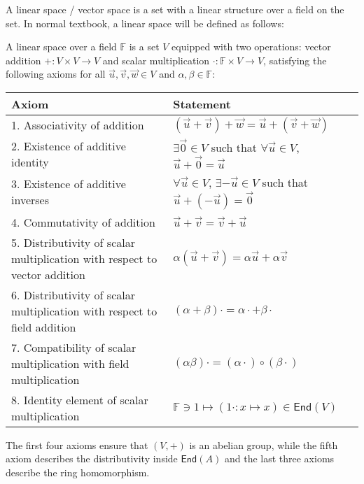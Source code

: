 \documentclass[
	11pt, %
	fleqn, %
	a4paper, %
]{LegrandOrangeBook}
\newcommand{\End}[1]{\mathsf{End}(#1)} %
\newcommand{\F}{\mathbb{F}} %
\begin{document}
A linear space / vector space is a set with a linear structure over a field on the set. In normal textbook, a linear space will be defined as follows:

\begin{corollary}
    A linear space over a field $\F$ is a set $V$ equipped with two operations: vector addition $+: V \times V \to V$ and scalar multiplication $\cdot : \F \times V \to V$, satisfying the following axioms for all $\vec{u}, \vec{v}, \vec{w} \in V$ and $\alpha, \beta \in \F$:
    \begin{center}
        \begin{tabularx}{\textwidth}{XX}
            \toprule
            \textbf{Axiom} & \textbf{Statement} \\
            \midrule
            1. Associativity of addition & $(\vec{u} + \vec{v}) + \vec{w} = \vec{u} + (\vec{v} + \vec{w})$ \\
            2. Existence of additive identity & $\exists \vec{0} \in V$ such that $\forall \vec{u} \in V$, $\vec{u} + \vec{0} = \vec{u}$ \\
            3. Existence of additive inverses & $\forall \vec{u} \in V$, $\exists -\vec{u} \in V$ such that $\vec{u} + (-\vec{u}) = \vec{0}$ \\
            4. Commutativity of addition & $\vec{u} + \vec{v} = \vec{v} + \vec{u}$ \\
            5. Distributivity of scalar multiplication with respect to vector addition & $\alpha (\vec{u} + \vec{v}) = \alpha \vec{u} + \alpha \vec{v}$ \\
            6. Distributivity of scalar multiplication with respect to field addition & $(\alpha + \beta) \cdot = \alpha \cdot + \beta \cdot$ \\
            7. Compatibility of scalar multiplication with field multiplication & $(\alpha \beta) \cdot = (\alpha \cdot) \circ (\beta \cdot)$ \\
            8. Identity element of scalar multiplication & $\F \ni 1 \mapsto (1\cdot : x \mapsto x) \in \End{V}$ \\
            \bottomrule
        \end{tabularx}
    \end{center}
\end{corollary}

\begin{remark}
    The first four axioms ensure that $(V, +)$ is an abelian group, while the fifth axiom describes the distributivity inside $\End{A}$ and the last three axioms describe the ring homomorphism.
\end{remark}
\end{document}
